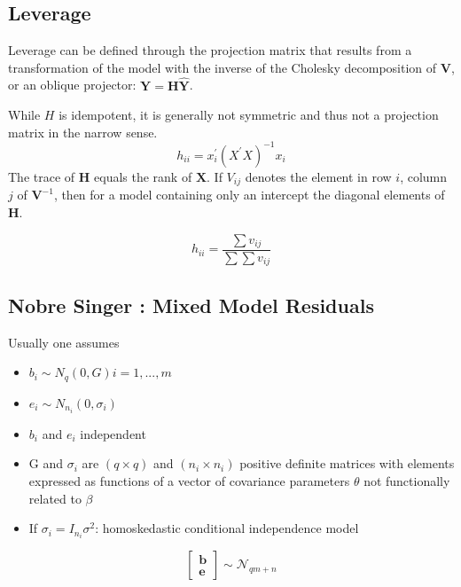 \documentclass[Main.tex]{subfiles}
\begin{document}
\subsection{Leverage}
Leverage can be defined through the projection matrix that results from a transformation of the model with the inverse of the Cholesky decomposition of $\boldsymbol{V}$, or an oblique projector:	$\boldsymbol{Y} = \boldsymbol{H}\boldsymbol{\hat{Y}}$.

While $H$ is idempotent, it is generally not symmetric and thus not a projection matrix in the narrow sense.
\[ h_{ii} = x^{\prime}_{i}(X^{\prime}X)^{-1}x_{i} \]
The trace of $\boldsymbol{H}$ equals the rank of $\boldsymbol{X}$.
If $V_{ij}$ denotes the element in row $i$, column $j$ of $\boldsymbol{V}^{-1}$, then for a model containing only an intercept the diagonal elements of $\boldsymbol{H}$.

\[ h_{ii} = \frac{\sum v_{ij}}{\sum \sum v_{ij}} \]



\subsection*{Nobre Singer :  Mixed Model Residuals }

Usually one assumes
\begin{itemize}
\item $b_i \sim N_q(0, G) i = 1, ..., m$
\item $e_i  \sim N_{n_i} (0, \sigma_i)$
\item $b_i$ and $e_i$ independent
\item G and $\sigma_i$ are $(q \times q)$ and $(n_i \times n_i)$ positive deﬁnite matrices with
elements expressed as functions of a vector of covariance parameters $\theta$ not functionally related to $\beta$
\item If $\sigma_i = I_{n_i} \sigma^2$: homoskedastic conditional independence model
\end{itemize}

\[  \left[ \begin{array}{c} \boldsymbol{b} \\ \boldsymbol{e} \end{array}\right] \sim \mathcal{N}_{qm+n} \] 

\end{document}
